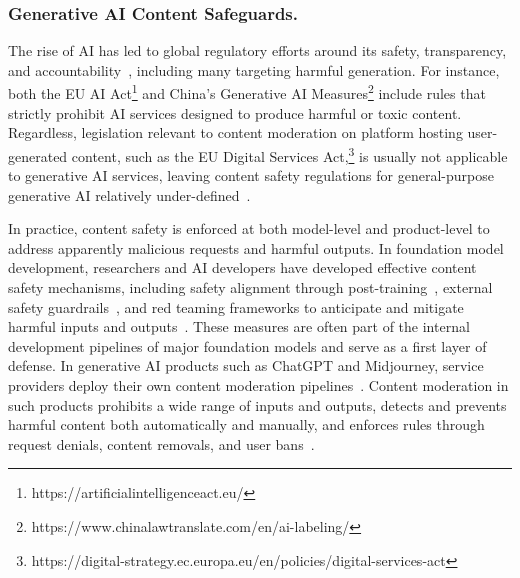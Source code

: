 
\subsubsection{Generative AI Content Safeguards.} The rise of AI has led to global regulatory efforts around its safety, transparency, and accountability~\cite{luna2024navigating}, including many targeting harmful generation. For instance, both the EU AI Act\footnote{\label{fn:euaiact}https://artificialintelligenceact.eu/} and China's Generative AI Measures\footnote{\label{fn:genaichina}https://www.chinalawtranslate.com/en/ai-labeling/} include rules that strictly prohibit AI services designed to produce harmful or toxic content. Regardless, legislation relevant to content moderation on platform hosting user-generated content, such as the EU Digital Services Act,\footnote{\label{fn:dsa}https://digital-strategy.ec.europa.eu/en/policies/digital-services-act} is usually not applicable to generative AI services, leaving content safety regulations for general-purpose generative AI relatively under-defined~\cite{hacker2023regulating}.

In practice, content safety is enforced at both model-level and product-level to address apparently malicious requests and harmful outputs. In foundation model development, researchers and AI developers have developed effective content safety mechanisms, including safety alignment through post-training~\cite{ji2023beavertails}, external safety guardrails~\cite{inan2023llama}, and red teaming frameworks to anticipate and mitigate harmful inputs and outputs~\cite{feffer2024red}. These measures are often part of the internal development pipelines of major foundation models and serve as a first layer of defense. In generative AI products such as ChatGPT and Midjourney, service providers deploy their own content moderation pipelines~\cite{mahomed2024auditing, gao2025cannot, riccio2024exploring}. Content moderation in such products prohibits a wide range of inputs and outputs, detects and prevents harmful content both automatically and manually, and enforces rules through request denials, content removals, and user bans~\cite{gao2025cannot}.

